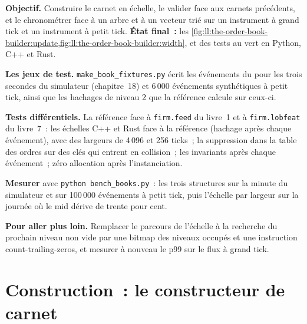 \begin{tutorial}
\textbf{Objectif.} Construire le carnet en échelle, le valider face aux carnets précédents, et le chronométrer face à un arbre et à un vecteur trié sur un
instrument à grand tick et un instrument à petit tick. \textbf{État final~:}
les \cref{fig:ll:the-order-book-builder:update,fig:ll:the-order-book-builder:width}, et des tests au vert en Python, C++ et Rust.
\begin{tutsteps}
\item \textbf{Les jeux de test.} \texttt{make\_book\_fixtures.py} écrit les événements du  pour les trois secondes du simulateur
(chapitre~18) et 6\,000 événements synthétiques à petit tick, ainsi que les hachages de niveau 2 que la référence calcule sur ceux-ci.
\item \textbf{Tests différentiels.} La référence face à \texttt{firm.feed} du livre~1 et à \texttt{firm.lobfeat} du livre~7~: les échelles C++
et Rust face à la référence (hachage après chaque événement), avec des largeurs de 4\,096 et 256 ticks~; la suppression dans la table des ordres
sur des clés qui entrent en collision~; les invariants après chaque événement~; zéro allocation après l'instanciation.
\item \textbf{Mesurer} avec \texttt{python bench\_books.py}~: les trois structures sur la minute du simulateur et sur 100\,000
événements à petit tick, puis l'échelle par largeur sur la journée où le mid dérive de trente pour cent.
\end{tutsteps}
\textbf{Pour aller plus loin.} Remplacer le parcours de l'échelle à la recherche du prochain niveau non vide par une bitmap des niveaux occupés et une
instruction count-trailing-zeros, et mesurer à nouveau le p99 sur le flux à grand tick.
\end{tutorial}

\section{Construction~: le constructeur de carnet}\label{bld:ll:the-order-book-builder:bookbuilder}

